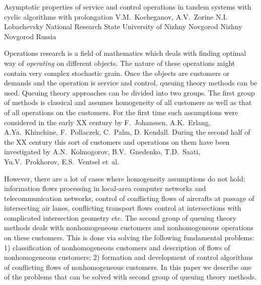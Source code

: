 %
%
%

\Title
{%
  Asymptotic properties of service and control operations in tandem systems with
  cyclic algorithms with prolongation } {%
V.M.~Kocheganov, A.V.~Zorine%
}
{%
N.I. Lobachevsky National Research State University of Nizhny Novgorod%
}
{%
Nizhny Novgorod
}
{%
Russia
}

%
%


Operations research is a field of mathematics which deals with finding optimal
way of \textit{operating} on different objects. The nature of these operations
might contain very complex stochastic grain.  Once the objects are customers or
demands and the operation is service and control, queuing theory methods can be
used. Queuing theory approaches can be divided into two groups. The first group
of methods is classical and assumes homogeneity of all customers as well as that
of all operations on the customers. For the first time such assumptions were
considered in the early XX century by F.~Johanssen, A.K.~Erlang,
A.Ya.~Khinchine, F.~Pollaczek, C.~Palm, D. Kendall. During the second half of
the XX century this sort of customers and operations on them have been
investigated by A.N.~Kolmogorov, B.V.~Gnedenko, T.D.~Saati, Yu.V.~Prokhorov,
E.S.~Ventsel et~al.

However, there are a lot of cases where homogeneity assumptions do not hold: information flows processing in local-area computer networks and telecommunication networks, control of conflicting flows of aircrafts at passage of intersecting air lanes, conflicting transport flows control at intersections with complicated intersection geometry etc.
The second group of queuing theory methods deals with nonhomogeneous customers
and nonhomogeneous operations on these customers. This is done via solving the following fundamental problems: 1) classification of nonhomogeneous customers
and description of flows of nonhomogeneous customers; 2) formation and development of control algorithms of conflicting flows of nonhomogeneous customers. In this paper we describe one of the problems that can be solved with second group of queuing theory methods.


